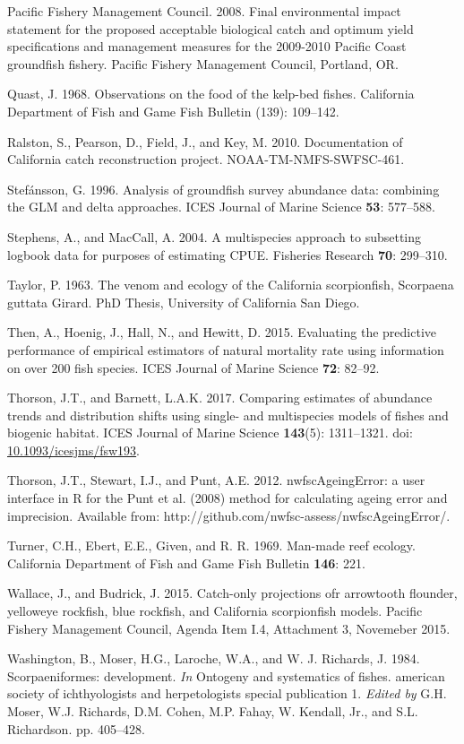 \documentclass[12pt,]{article}
\begin{document}
\hypertarget{ref-PFMC2008}{}
Pacific Fishery Management Council. 2008. Final environmental impact
statement for the proposed acceptable biological catch and optimum yield
specifications and management measures for the 2009-2010 Pacific Coast
groundfish fishery. Pacific Fishery Management Council, Portland, OR.

\hypertarget{ref-Quast1968}{}
Quast, J. 1968. Observations on the food of the kelp-bed fishes.
California Department of Fish and Game Fish Bulletin (139): 109--142.

\hypertarget{ref-Ralston2010}{}
Ralston, S., Pearson, D., Field, J., and Key, M. 2010. Documentation of
California catch reconstruction project. NOAA-TM-NMFS-SWFSC-461.

\hypertarget{ref-Stefansson1996}{}
Stefánsson, G. 1996. Analysis of groundfish survey abundance data:
combining the GLM and delta approaches. ICES Journal of Marine Science
\textbf{53}: 577--588.

\hypertarget{ref-Stephens2004}{}
Stephens, A., and MacCall, A. 2004. A multispecies approach to
subsetting logbook data for purposes of estimating CPUE. Fisheries
Research \textbf{70}: 299--310.

\hypertarget{ref-Taylor1963}{}
Taylor, P. 1963. The venom and ecology of the California scorpionfish,
Scorpaena guttata Girard. PhD Thesis, University of California San
Diego.

\hypertarget{ref-Then2015}{}
Then, A., Hoenig, J., Hall, N., and Hewitt, D. 2015. Evaluating the
predictive performance of empirical estimators of natural mortality rate
using information on over 200 fish species. ICES Journal of Marine
Science \textbf{72}: 82--92.

\hypertarget{ref-Thorson2017}{}
Thorson, J.T., and Barnett, L.A.K. 2017. Comparing estimates of
abundance trends and distribution shifts using single- and multispecies
models of fishes and biogenic habitat. ICES Journal of Marine Science
\textbf{143}(5): 1311--1321. doi:
\href{https://doi.org/10.1093/icesjms/fsw193}{10.1093/icesjms/fsw193}.

\hypertarget{ref-Thorson2012}{}
Thorson, J.T., Stewart, I.J., and Punt, A.E. 2012. nwfscAgeingError: a
user interface in R for the Punt et al. (2008) method for calculating
ageing error and imprecision. Available from:
http://github.com/nwfsc-assess/nwfscAgeingError/.

\hypertarget{ref-Turner1969}{}
Turner, C.H., Ebert, E.E., Given, and R. R. 1969. Man-made reef ecology.
California Department of Fish and Game Fish Bulletin \textbf{146}: 221.

\hypertarget{ref-Wallace2015}{}
Wallace, J., and Budrick, J. 2015. Catch-only projections ofr arrowtooth
flounder, yelloweye rockfish, blue rockfish, and California scorpionfish
models. Pacific Fishery Management Council, Agenda Item I.4, Attachment
3, Novemeber 2015.

\hypertarget{ref-Washington1984}{}
Washington, B., Moser, H.G., Laroche, W.A., and W. J. Richards, J. 1984.
Scorpaeniformes: development. \emph{In} Ontogeny and systematics of
fishes. american society of ichthyologists and herpetologists special
publication 1. \emph{Edited by} G.H. Moser, W.J. Richards, D.M. Cohen,
M.P. Fahay, W. Kendall, Jr., and S.L. Richardson. pp. 405--428.
\end{document}
